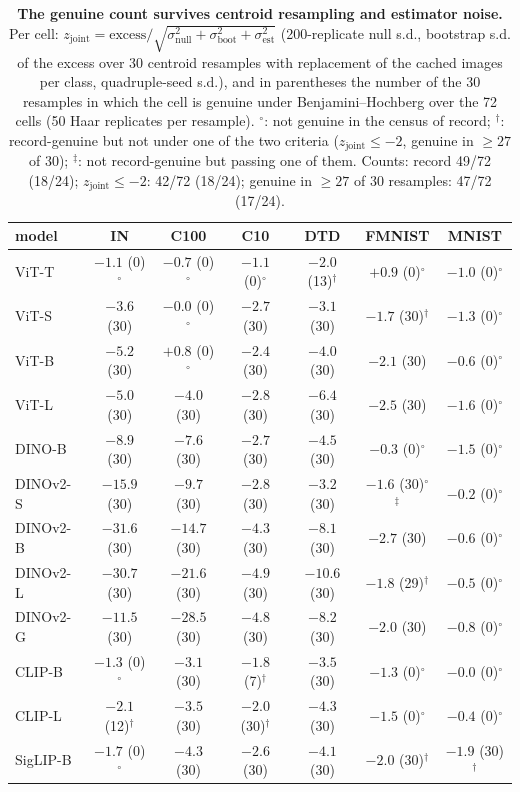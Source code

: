 \begin{table}[H]
\centering
\scriptsize
\setlength{\tabcolsep}{2.6pt}
\begin{tabular}{lcccccc}
\toprule
model & IN & C100 & C10 & DTD & FMNIST & MNIST \\
\midrule
ViT-T & $-1.1$ (0)$^{\circ}$ & $-0.7$ (0)$^{\circ}$ & $-1.1$ (0)$^{\circ}$ & $-2.0$ (13)$^{\dagger}$ & $+0.9$ (0)$^{\circ}$ & $-1.0$ (0)$^{\circ}$ \\
ViT-S & $-3.6$ (30) & $-0.0$ (0)$^{\circ}$ & $-2.7$ (30) & $-3.1$ (30) & $-1.7$ (30)$^{\dagger}$ & $-1.3$ (0)$^{\circ}$ \\
ViT-B & $-5.2$ (30) & $+0.8$ (0)$^{\circ}$ & $-2.4$ (30) & $-4.0$ (30) & $-2.1$ (30) & $-0.6$ (0)$^{\circ}$ \\
ViT-L & $-5.0$ (30) & $-4.0$ (30) & $-2.8$ (30) & $-6.4$ (30) & $-2.5$ (30) & $-1.6$ (0)$^{\circ}$ \\
\midrule
DINO-B & $-8.9$ (30) & $-7.6$ (30) & $-2.7$ (30) & $-4.5$ (30) & $-0.3$ (0)$^{\circ}$ & $-1.5$ (0)$^{\circ}$ \\
DINOv2-S & $-15.9$ (30) & $-9.7$ (30) & $-2.8$ (30) & $-3.2$ (30) & $-1.6$ (30)$^{\circ}$$^{\ddagger}$ & $-0.2$ (0)$^{\circ}$ \\
DINOv2-B & $-31.6$ (30) & $-14.7$ (30) & $-4.3$ (30) & $-8.1$ (30) & $-2.7$ (30) & $-0.6$ (0)$^{\circ}$ \\
DINOv2-L & $-30.7$ (30) & $-21.6$ (30) & $-4.9$ (30) & $-10.6$ (30) & $-1.8$ (29)$^{\dagger}$ & $-0.5$ (0)$^{\circ}$ \\
DINOv2-G & $-11.5$ (30) & $-28.5$ (30) & $-4.8$ (30) & $-8.2$ (30) & $-2.0$ (30) & $-0.8$ (0)$^{\circ}$ \\
\midrule
CLIP-B & $-1.3$ (0)$^{\circ}$ & $-3.1$ (30) & $-1.8$ (7)$^{\dagger}$ & $-3.5$ (30) & $-1.3$ (0)$^{\circ}$ & $-0.0$ (0)$^{\circ}$ \\
CLIP-L & $-2.1$ (12)$^{\dagger}$ & $-3.5$ (30) & $-2.0$ (30)$^{\dagger}$ & $-4.3$ (30) & $-1.5$ (0)$^{\circ}$ & $-0.4$ (0)$^{\circ}$ \\
SigLIP-B & $-1.7$ (0)$^{\circ}$ & $-4.3$ (30) & $-2.6$ (30) & $-4.1$ (30) & $-2.0$ (30)$^{\dagger}$ & $-1.9$ (30)$^{\dagger}$ \\
\bottomrule
\end{tabular}
\caption{\textbf{The genuine count survives centroid resampling and estimator noise.} Per cell: $z_{\text{joint}} = \text{excess}/\sqrt{\sigma_{\text{null}}^2+\sigma_{\text{boot}}^2+\sigma_{\text{est}}^2}$ (200-replicate null s.d., bootstrap s.d. of the excess over 30 centroid resamples with replacement of the cached images per class, quadruple-seed s.d.), and in parentheses the number of the 30 resamples in which the cell is genuine under Benjamini--Hochberg over the 72 cells (50 Haar replicates per resample). $^{\circ}$: not genuine in the census of record; $^{\dagger}$: record-genuine but not under one of the two criteria ($z_{\text{joint}}\le-2$, genuine in $\ge27$ of 30); $^{\ddagger}$: not record-genuine but passing one of them. Counts: record 49/72 (18/24); $z_{\text{joint}}\le-2$: 42/72 (18/24); genuine in $\ge27$ of 30 resamples: 47/72 (17/24). %
}
\label{tab:b38-joint}
\end{table}
